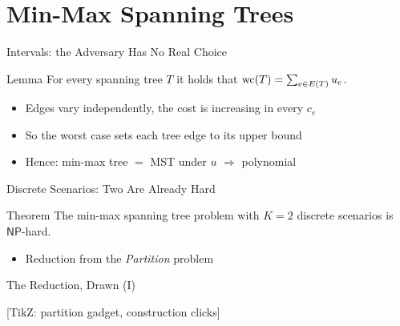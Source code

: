 \documentclass[aspectratio=169,11pt]{beamer}
\begin{document}
\section{Min-Max Spanning Trees}

\begin{frame}{Intervals: the Adversary Has No Real Choice}
  \begin{block}{Lemma}
    For every spanning tree $T$ it holds that $\mathrm{wc}(T) = \sum_{e \in E(T)} u_e$.
  \end{block}
  \begin{itemize}
    \item<2-> Edges vary independently, the cost is increasing in every $c_e$
    \item<3-> So the worst case sets each tree edge to its upper bound
    \item<4-> Hence: min-max tree $=$ MST under $u$ \textcolor{RWTHGreen}{$\Rightarrow$ polynomial}
  \end{itemize}
  \medskip
\end{frame}

\begin{frame}{Discrete Scenarios: Two Are Already Hard}
  \begin{block}{Theorem}
    The min-max spanning tree problem with $K = 2$ discrete scenarios is $\mathsf{NP}$-hard.
  \end{block}
  \begin{itemize}
    \item<2-> Reduction from the \emph{Partition} problem
  \end{itemize}
  \medskip
\end{frame}

\begin{frame}{The Reduction, Drawn (I)}
  \begin{center}\textcolor{RWTHOrange}{[TikZ: partition gadget, construction clicks]}\end{center}
\end{frame}
\end{document}
